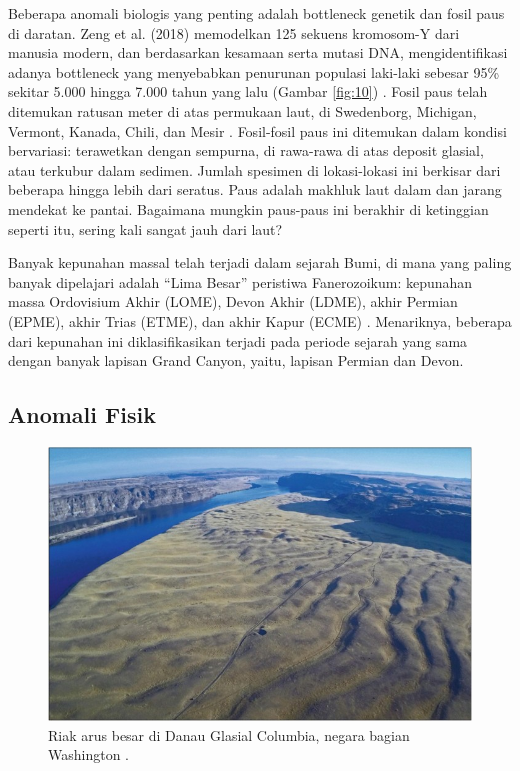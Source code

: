 \documentclass[10pt,twocolumn,letterpaper]{article}
\begin{document}
Beberapa anomali biologis yang penting adalah bottleneck genetik dan fosil paus di daratan. Zeng et al. (2018) memodelkan 125 sekuens kromosom-Y dari manusia modern, dan berdasarkan kesamaan serta mutasi DNA, mengidentifikasi adanya bottleneck yang menyebabkan penurunan populasi laki-laki sebesar 95\% sekitar 5.000 hingga 7.000 tahun yang lalu (Gambar \ref{fig:10}) \cite{62}. Fosil paus telah ditemukan ratusan meter di atas permukaan laut, di Swedenborg, Michigan, Vermont, Kanada, Chili, dan Mesir \cite{63,64,65,66}. Fosil-fosil paus ini ditemukan dalam kondisi bervariasi: terawetkan dengan sempurna, di rawa-rawa di atas deposit glasial, atau terkubur dalam sedimen. Jumlah spesimen di lokasi-lokasi ini berkisar dari beberapa hingga lebih dari seratus. Paus adalah makhluk laut dalam dan jarang mendekat ke pantai. Bagaimana mungkin paus-paus ini berakhir di ketinggian seperti itu, sering kali sangat jauh dari laut?

Banyak kepunahan massal telah terjadi dalam sejarah Bumi, di mana yang paling banyak dipelajari adalah “Lima Besar” peristiwa Fanerozoikum: kepunahan massa Ordovisium Akhir (LOME), Devon Akhir (LDME), akhir Permian (EPME), akhir Trias (ETME), dan akhir Kapur (ECME) \cite{88,89}. Menariknya, beberapa dari kepunahan ini diklasifikasikan terjadi pada periode sejarah yang sama dengan banyak lapisan Grand Canyon, yaitu, lapisan Permian dan Devon.

\subsection{Anomali Fisik}

\begin{figure}[b]
\begin{center}
   \includegraphics[width=1\linewidth]{columbia.jpg}
\end{center}
   \caption{Riak arus besar di Danau Glasial Columbia, negara bagian Washington \cite{80}.}
\label{fig:11}
\label{fig:onecol}
\end{figure}
\end{document}
